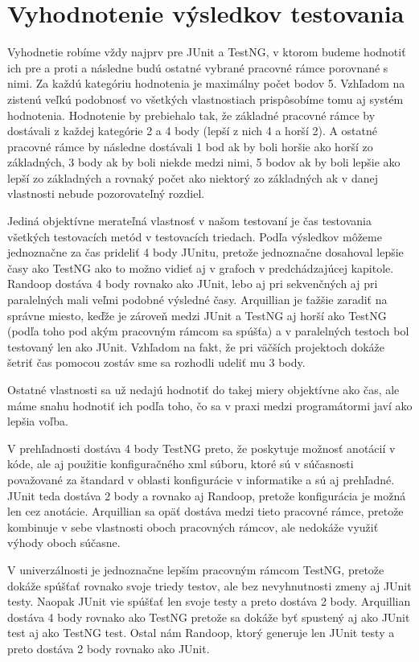 \documentclass[11pt,twoside,slovak,a4paper]{article}
\begin{document}
	\newpage
	
	\section{Vyhodnotenie výsledkov testovania}
	Vyhodnetie robíme vždy najprv pre JUnit a TestNG, v ktorom budeme hodnotiť ich pre a proti a následne budú ostatné vybrané pracovné rámce porovnané s nimi. Za každú kategóriu hodnotenia je maximálny počet bodov 5. Vzhľadom na zistenú veľkú podobnosť vo všetkých vlastnostiach prispôsobíme tomu aj systém hodnotenia. Hodnotenie by prebiehalo tak, že základné pracovné rámce by dostávali z každej kategórie 2 a 4 body (lepší z nich 4 a horší 2). A ostatné pracovné rámce by následne dostávali 1 bod ak by boli horšie ako horší zo základných, 3 body ak by boli niekde medzi nimi, 5 bodov ak by boli lepšie ako lepší zo základných a rovnaký počet ako niektorý zo základných ak v danej vlastnosti nebude pozorovateľný rozdiel.
	
	Jediná objektívne merateľná vlastnosť v našom testovaní je čas testovania všetkých testovacích metód v testovacích triedach. Podľa výsledkov môžeme jednoznačne za čas prideliť 4 body JUnitu, pretože jednoznačne dosahoval lepšie časy ako TestNG ako to možno vidieť aj v grafoch v predchádzajúcej kapitole. Randoop dostáva 4 body rovnako ako JUnit, lebo aj pri sekvenčných aj pri paralelných mali veľmi podobné výsledné časy. Arquillian je ťažšie zaradiť na správne miesto, keďže je zároveň medzi JUnit a TestNG aj horší ako TestNG (podľa toho pod akým pracovným rámcom sa spúšťa) a v paralelných testoch bol testovaný len ako JUnit. Vzhľadom na fakt, že pri väčších projektoch dokáže šetriť čas pomocou zostáv sme sa rozhodli udeliť mu 3 body.
	
	Ostatné vlastnosti sa už nedajú hodnotiť do takej miery objektívne ako čas, ale máme snahu hodnotiť ich podľa toho, čo sa v praxi medzi programátormi javí ako lepšia voľba.
	
	V prehľadnosti dostáva 4 body TestNG preto, že poskytuje možnosť anotácií v kóde, ale aj použitie konfiguračného xml súboru, ktoré sú v súčasnosti považované za štandard v oblasti konfigurácie v informatike a sú aj prehľadné. JUnit teda dostáva 2 body a rovnako aj Randoop, pretože konfigurácia je možná len cez anotácie. Arquillian sa opäť dostáva medzi tieto pracovné rámce, pretože kombinuje v sebe vlastnosti oboch pracovných rámcov, ale nedokáže využiť výhody oboch súčasne.
	
	V univerzálnosti je jednoznačne lepším pracovným rámcom TestNG, pretože dokáže spúšťať rovnako svoje triedy testov, ale bez nevyhnutnosti zmeny aj JUnit testy. Naopak JUnit vie spúšťať len svoje testy a preto dostáva 2 body. Arquillian dostáva 4 body rovnako ako TestNG pretože sa dokáže byť spustený aj ako JUnit test aj ako TestNG test. Ostal nám Randoop, ktorý generuje len JUnit testy a preto dostáva 2 body rovnako ako JUnit.
	
\end{document}
